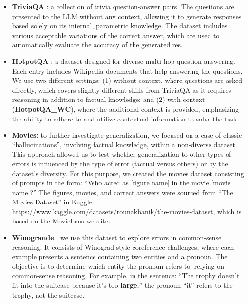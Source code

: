 \documentclass{article} %
\begin{document}
\begin{itemize}
    \item \textbf{TriviaQA} \citep{joshi2017triviaqa}: a collection of trivia question-answer pairs. The questions are presented to the LLM without any context, allowing it to generate responses based solely on its internal, parametric knowledge. The dataset includes various acceptable variations of the correct answer, which are used to automatically evaluate the accuracy of the generated res.
    \item \textbf{HotpotQA} \citep{yang2018hotpotqa}: a dataset designed for diverse multi-hop question answering. Each entry includes Wikipedia documents that help answering the questions. We use two different settings:
    (1) without context, where questions are asked directly, which covers slightly different skills from TriviaQA as it requires reasoning in addition to factual knowledge; and
    (2) with context (\textbf{HotpotQA\_WC}), where the additional context is provided, emphasizing the ability to adhere to and utilize contextual information to solve the task.
    \item \textbf{Movies:}
    to further investigate generalization, we focused on a case of classic ``hallucinations'', involving factual knowledge, within a non-diverse dataset. This approach allowed us to test whether generalization to other types of errors is influenced by the type of error (factual versus others) or by the dataset's diversity.
    For this purpose, we created the movies dataset consisting of prompts in the form: “Who acted as [figure name] in the movie [movie name]?”
    The figures, movies, and correct answers were sourced from ``The Movies Dataset'' in Kaggle: \url{https://www.kaggle.com/datasets/rounakbanik/the-movies-dataset}, which is based on the MovieLens website.
    \item \textbf{Winogrande} \citep{sakaguchi2021winogrande}:
    we use this dataset to explore errors in common-sense reasoning.
    It consists of Winograd-style coreference challenges, where each example presents a sentence containing two entities and a pronoun. 
    The objective is to determine which entity the pronoun refers to, relying on common-sense reasoning. For example, in the sentence: ``The trophy doesn’t fit into the suitcase because it’s too \textbf{large},'' the pronoun ``it'' refers to the trophy, not the suitcase.

\end{itemize}
\end{document}
